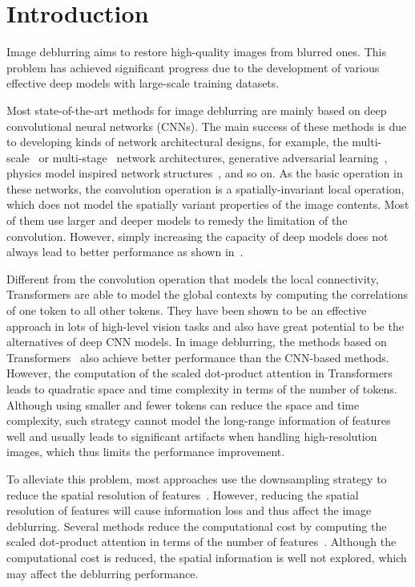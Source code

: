 \documentclass[10pt,twocolumn,letterpaper]{article}
\begin{document}
\vspace{-2mm}
\section{Introduction}
\label{sec:intro}
Image deblurring aims to restore high-quality images from blurred ones. This problem has achieved significant progress due to the development of various effective deep models with large-scale training datasets.

Most state-of-the-art methods for image deblurring are mainly based on deep convolutional neural networks (CNNs). The main success of these methods is due to developing kinds of network architectural designs, for example, the multi-scale~\cite{GoPro,SRN,MIMO} or multi-stage~\cite{DMPHN,MPRNet} network architectures, generative adversarial learning~\cite{DeblurGAN,DeblurGANv2}, physics model inspired network structures~\cite{svrnn,physicgan}, and so on.
As the basic operation in these networks, the convolution operation is a spatially-invariant local operation, which does not model the spatially variant properties of the image contents. Most of them use larger and deeper models to remedy the limitation of the convolution. However, simply increasing the capacity of deep models does not always lead to better performance as shown in~\cite{svrnn,physicgan}.


Different from the convolution operation that models the local connectivity, Transformers are able to model the global contexts by computing the correlations of one token to all other tokens. They have been shown to be an effective approach in lots of high-level vision tasks and also have great potential to be the alternatives of deep CNN models.
In image deblurring, the methods based on Transformers~\cite{Restormer,Uformer} also achieve better performance than the CNN-based methods.
However, the computation of the scaled dot-product attention in Transformers leads to quadratic space and time complexity in terms of the number of tokens.
Although using smaller and fewer tokens can reduce the space and time complexity, such strategy cannot model the long-range information of features well and usually leads to significant artifacts when handling high-resolution images, which thus limits the performance improvement.

To alleviate this problem, most approaches use the downsampling strategy to reduce the spatial resolution of features~\cite{PyramidVIT}. However, reducing the spatial resolution of features will cause information loss and thus affect the image deblurring.
Several methods reduce the computational cost by computing the scaled dot-product attention in terms of the number of features~\cite{Restormer,cotransformer}.
Although the computational cost is reduced, the spatial information is well not explored, which may affect the deblurring performance.
\end{document}
